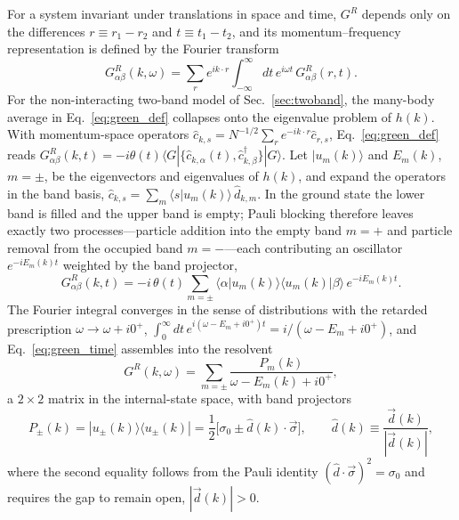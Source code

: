 \documentclass[onecolumn,aps,prl,superscriptaddress,longbibliography]{revtex4-2}
\begin{document}
For a system invariant under translations in space and time, $G^R$ depends only on the differences $r\equiv r_1-r_2$ and $t\equiv t_1-t_2$, and its momentum--frequency representation is defined by the Fourier transform \cite{estakeRoy2025}
\begin{equation}\label{eq:green_ft}
  G^R_{\alpha\beta}(k,\omega) = \sum_r e^{ik\cdot r}\int_{-\infty}^{\infty}dt\,e^{i\omega t}\,G^R_{\alpha\beta}(r,t).
\end{equation}
For the non-interacting two-band model of Sec.~\ref{sec:twoband}, the many-body average in Eq.~\eqref{eq:green_def} collapses onto the eigenvalue problem of $h(k)$. With momentum-space operators $\hat{c}_{k,s}=N^{-1/2}\sum_r e^{-ik\cdot r}\hat{c}_{r,s}$, Eq.~\eqref{eq:green_def} reads $G^R_{\alpha\beta}(k,t)=-i\theta(t)\langle G|\{\hat{c}_{k,\alpha}(t),\hat{c}^{\dagger}_{k,\beta}\}|G\rangle$. Let $|u_m(k)\rangle$ and $E_m(k)$, $m=\pm$, be the eigenvectors and eigenvalues of $h(k)$, and expand the operators in the band basis, $\hat{c}_{k,s}=\sum_m\langle s|u_m(k)\rangle\,\hat{d}_{k,m}$. In the ground state the lower band is filled and the upper band is empty; Pauli blocking therefore leaves exactly two processes---particle addition into the empty band $m=+$ and particle removal from the occupied band $m=-$---each contributing an oscillator $e^{-iE_m(k)t}$ weighted by the band projector,
\begin{equation}\label{eq:green_time}
  G^R_{\alpha\beta}(k,t) = -i\,\theta(t)\sum_{m=\pm}\langle\alpha|u_m(k)\rangle\langle u_m(k)|\beta\rangle\,e^{-iE_m(k)t}.
\end{equation}
The Fourier integral converges in the sense of distributions with the retarded prescription $\omega\to\omega+i0^+$, $\int_0^{\infty}dt\,e^{i(\omega-E_m+i0^+)t}=i/(\omega-E_m+i0^+)$, and Eq.~\eqref{eq:green_time} assembles into the resolvent
\begin{equation}\label{eq:green_resolvent}
  G^R(k,\omega) = \sum_{m=\pm}\frac{P_m(k)}{\omega-E_m(k)+i0^+},
\end{equation}
a $2\times 2$ matrix in the internal-state space, with band projectors
\begin{equation}\label{eq:projector}
  P_\pm(k) = |u_\pm(k)\rangle\langle u_\pm(k)| = \frac{1}{2}\Big[\sigma_0\pm\hat{d}(k)\cdot\vec{\sigma}\Big],
  \qquad
  \hat{d}(k)\equiv\frac{\vec{d}(k)}{|\vec{d}(k)|},
\end{equation}
where the second equality follows from the Pauli identity $(\hat{d}\cdot\vec{\sigma})^2=\sigma_0$ and requires the gap to remain open, $|\vec{d}(k)|>0$.
\end{document}

